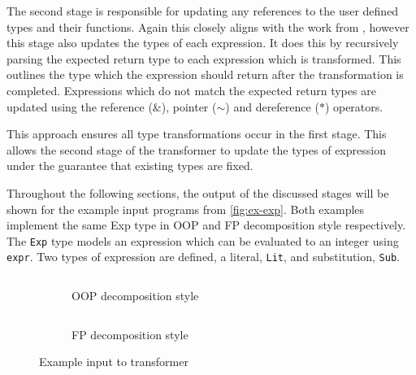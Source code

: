 \documentclass[ oneside,%
                    author={James Elgar},
                    degree={MEng},
                     title={Bidirectional transformer between functional and \\ object-oriented programming in Rust},
                  subtitle={}]{dissertation}
\newcommand{\rust}[1]{\texttt{#1}}
\newcommand{\codefileLN}[4]{\inputminted[xleftmargin=20pt,linenos, breaklines, firstline=#3, lastline=#4]{#1}{#2}}
\newcommand{\rustfileLN}[3]{\codefileLN{rust}{../#1.rs}{#2}{#3}}
\newcommand{\rustexampleLN}[3]{\rustfileLN{examples/src/#1}{#2}{#3}}
\begin{document}
The second stage is responsible for updating any references to the user defined types and their functions. Again this closely aligns with the work from \cite{food}, however this stage also updates the types of each expression. It does this by recursively parsing the expected return type to each expression which is transformed. This outlines the type which the expression should return after the transformation is completed. Expressions which do not match the expected return types are updated using the reference ($\&$), pointer ($\sim$) and dereference ($*$) operators. 

This approach ensures all type transformations occur in the first stage. This allows the second stage of the transformer to update the types of expression under the guarantee that existing types are fixed. 

Throughout the following sections, the output of the discussed stages will be shown for the example input programs from \autoref{fig:ex-exp}. Both examples implement the same Exp type in OOP and FP decomposition style respectively. The \rust{Exp} type models an expression which can be evaluated to an integer using \rust{expr}. Two types of expression are defined, a literal, \rust{Lit}, and substitution, \rust{Sub}.

\begin{figure}
\centering
\begin{subfigure}{.5\textwidth}
    \rustexampleLN{exp/oop}{1}{22}
    \caption{OOP decomposition style}
    \label{fig:dec-ex-oop}
\end{subfigure}%
\begin{subfigure}{.5\textwidth}
    \rustexampleLN{exp/fp}{1}{11}
    \caption{FP decomposition style}
    \label{fig:dec-ex-fp}
\end{subfigure}
\caption{Example input to transformer}
\label{fig:ex-exp}
\end{figure}

        
\end{document}
